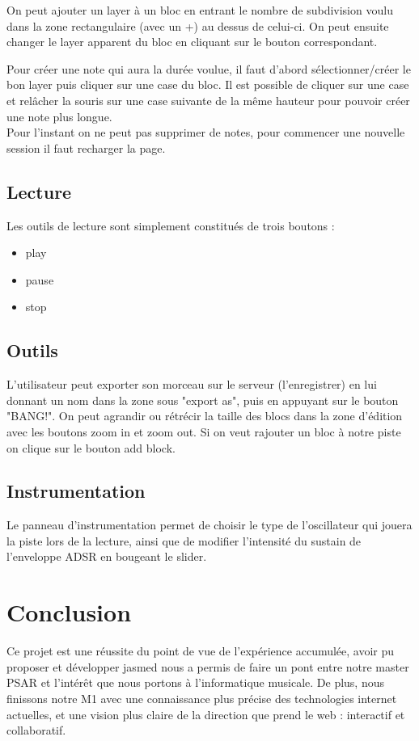 \documentclass[pdftex,12pt,a4paper]{article}
\begin{document}
\medskip
On peut ajouter un layer à un bloc en entrant le nombre de subdivision voulu dans la zone rectangulaire (avec un +) au dessus de celui-ci.
On peut ensuite changer le layer apparent du bloc en cliquant sur le bouton correspondant.

\medskip
Pour créer une note qui aura la durée voulue, il faut d'abord sélectionner/créer le bon layer puis cliquer sur une case du bloc.
Il est possible de cliquer sur une case et relâcher la souris sur une case suivante de la même hauteur pour pouvoir créer une note plus longue.\\
Pour l'instant on ne peut pas supprimer de notes, pour commencer une nouvelle session il faut recharger la page.

\subsection{Lecture}
Les outils de lecture sont simplement constitués de trois boutons :
\begin{itemize}
\item play
\item pause
\item stop
\end{itemize}
    
\subsection{Outils}
L'utilisateur peut exporter son morceau sur le serveur (l'enregistrer) en lui donnant un nom dans la zone sous "export as", puis en appuyant sur le bouton "BANG!".
On peut agrandir ou rétrécir la taille des blocs dans la zone d'édition avec les boutons zoom in et zoom out.
Si on veut rajouter un bloc à notre piste on clique sur le bouton add block.
    
\subsection{Instrumentation}
Le panneau d'instrumentation permet de choisir le type de l'oscillateur qui jouera la piste lors de la lecture, ainsi que de modifier l'intensité du sustain de l'enveloppe ADSR en bougeant le slider.

\section{Conclusion}
Ce projet est une réussite du point de vue de l’expérience accumulée, avoir pu proposer et développer jasmed nous a permis de faire un pont entre notre master PSAR et l’intérêt que nous portons à l’informatique musicale. De plus, nous finissons notre M1 avec une connaissance plus précise des technologies internet actuelles, et une vision plus claire de la direction que prend le web : interactif et collaboratif.
\end{document}
